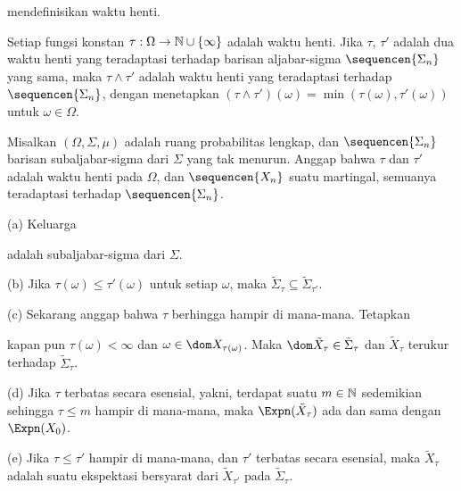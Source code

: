 \noindent mendefinisikan waktu henti.

 Setiap fungsi konstan
$\tau:\Omega\to\Bbb N\cup\{\infty\}$ adalah waktu henti. Jika $\tau$,
$\tau'$ adalah dua waktu henti yang teradaptasi terhadap barisan aljabar-sigma
$\sequencen{\Sigma_n}$ yang sama, maka $\tau\wedge\tau'$ adalah waktu henti
yang teradaptasi terhadap $\sequencen{\Sigma_n}$, dengan menetapkan
$(\tau\wedge\tau')(\omega)=\min(\tau(\omega),\tau'(\omega))$ untuk
$\omega\in\Omega$.

 Misalkan $(\Omega,\Sigma,\mu)$ adalah ruang
probabilitas lengkap, dan $\sequencen{\Sigma_n}$ barisan subaljabar-sigma dari
$\Sigma$ yang tak menurun. Anggap bahwa $\tau$ dan $\tau'$ adalah waktu henti
pada $\Omega$, dan $\sequencen{X_n}$ suatu martingal, semuanya teradaptasi
terhadap $\sequencen{\Sigma_n}$.

(a) Keluarga


\noindent adalah subaljabar-sigma dari $\Sigma$.

(b) Jika $\tau(\omega)\le\tau'(\omega)$ untuk setiap $\omega$, maka
$\tilde\Sigma_{\tau}\subseteq\tilde\Sigma_{\tau'}$.

(c) Sekarang anggap bahwa $\tau$ berhingga hampir di mana-mana. Tetapkan


\noindent kapan pun $\tau(\omega)<\infty$ dan
$\omega\in\dom X_{\tau(\omega)}$. Maka
$\dom\tilde X_{\tau}\in\tilde\Sigma_{\tau}$ dan $\tilde X_{\tau}$ terukur
terhadap $\tilde\Sigma_{\tau}$.

(d) Jika $\tau$ terbatas secara esensial, yakni, terdapat suatu
$m\in\Bbb N$ sedemikian sehingga $\tau\le m$ hampir di mana-mana, maka
$\Expn(\tilde X_{\tau})$ ada dan sama dengan $\Expn(X_0)$.

(e) Jika $\tau\le\tau'$ hampir di mana-mana, dan $\tau'$ terbatas secara
esensial, maka $\tilde X_{\tau}$ adalah suatu ekspektasi bersyarat dari
$\tilde X_{\tau'}$ pada $\tilde\Sigma_{\tau}$.


